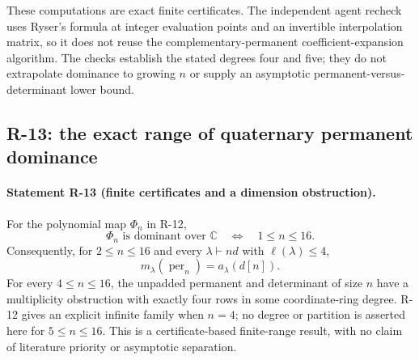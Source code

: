 These computations are exact finite certificates. The independent
agent recheck uses Ryser's formula at integer evaluation points
and an invertible interpolation matrix, so it does not reuse
the complementary-permanent coefficient-expansion algorithm.
The checks establish the stated degrees four and five; they
do not extrapolate dominance to growing $n$ or supply an
asymptotic permanent-versus-determinant lower bound.

\subsection{R-13: the exact range of quaternary permanent dominance}

\paragraph{Statement R-13 (finite certificates and a dimension obstruction).}
For the polynomial map $\Phi_n$ in R-12,
\begin{equation}\label{R13:range}
 \Phi_n\text{ is dominant over }\mathbb C
 \quad\Longleftrightarrow\quad1\leq n\leq16.
\end{equation}
Consequently, for $2\leq n\leq16$ and every
$\lambda\vdash nd$ with $\ell(\lambda)\leq4$,
\begin{equation}\label{R13:multiplicities}
 m_\lambda(\operatorname{per}_n)=a_\lambda(d[n]).
\end{equation}
For every $4\leq n\leq16$, the unpadded permanent and determinant
of size $n$ have a multiplicity obstruction with exactly four rows
in some coordinate-ring degree. R-12 gives an explicit infinite
family when $n=4$; no degree or partition is asserted here for
$5\leq n\leq16$. This is a certificate-based finite-range result,
with no claim of literature priority or asymptotic separation.

